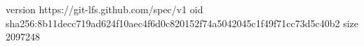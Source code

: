 version https://git-lfs.github.com/spec/v1
oid sha256:8b11decc719ad624f10aec4f6d0c820152f74a5042045c1f49f71cc73d5c40b2
size 2097248

